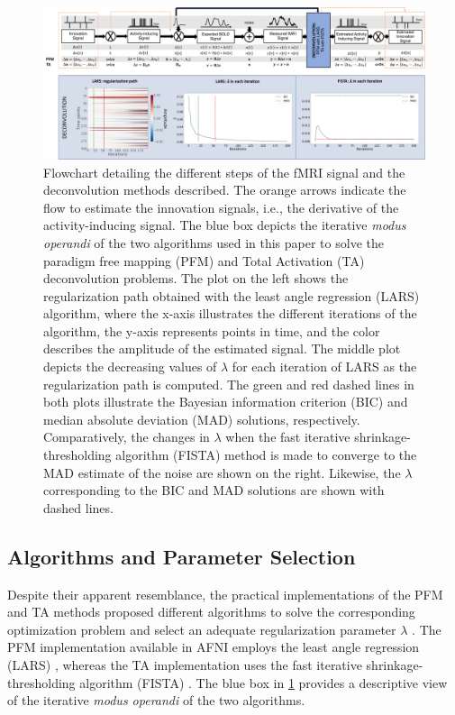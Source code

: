 \begin{figure}[t!]
    \begin{center}
        \includegraphics[width=\textwidth]{figures/synthesis_analysis/flowchart.pdf}
    \end{center}
    \caption{Flowchart detailing the different steps of the fMRI signal and the
    deconvolution methods described. The orange arrows indicate the flow to
    estimate the innovation signals, i.e., the derivative of the
    activity-inducing signal. The blue box depicts the iterative \textit{modus
    operandi} of the two algorithms used in this paper to solve the paradigm
    free mapping (PFM) and Total Activation (TA) deconvolution problems. The plot on the
    left shows the regularization path obtained with the least angle regression
    (LARS) algorithm, where the x-axis illustrates the different iterations of
    the algorithm, the y-axis represents points in time, and the color describes
    the amplitude of the estimated signal. The middle plot depicts the
    decreasing values of $\lambda$ for each iteration of LARS as the
    regularization path is computed. The green and red dashed lines in both
    plots illustrate the Bayesian information criterion (BIC) and median
    absolute deviation (MAD) solutions, respectively. Comparatively, the changes
    in $\lambda$ when the fast iterative shrinkage-thresholding algorithm
    (FISTA) method is made to converge to the MAD estimate of the noise are
    shown on the right. Likewise, the $\lambda$ corresponding to the BIC and MAD
    solutions are shown with dashed lines.}
\label{fig:flowchart}
\end{figure}

\subsection{Algorithms and Parameter Selection}
\label{sec:regparam}
Despite their apparent resemblance, the practical implementations of the PFM and
TA methods proposed different algorithms to solve the corresponding optimization
problem and select an adequate regularization parameter $\lambda$
\citep{Gaudes2013Paradigmfreemapping,Karahanoglu2013TotalactivationfMRI}. The
PFM implementation available in AFNI employs the least angle regression (LARS)
\citep{Efron2004Leastangleregression}, whereas the TA implementation uses the
fast iterative shrinkage-thresholding algorithm (FISTA)
\citep{Beck2009FastIterativeShrinkage}. The blue box in \cref{fig:flowchart}
provides a descriptive view of the iterative \textit{modus operandi} of the two
algorithms.

